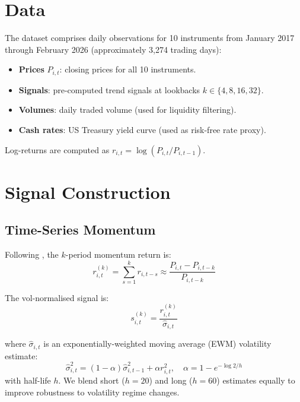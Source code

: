 \documentclass[11pt,a4paper]{article}
\begin{document}
\section{Data}

The dataset comprises daily observations for 10 instruments from January 2017 through
February 2026 (approximately 3,274 trading days):
\begin{itemize}
  \item \textbf{Prices} $P_{i,t}$: closing prices for all 10 instruments.
  \item \textbf{Signals}: pre-computed trend signals at lookbacks $k \in \{4, 8, 16, 32\}$.
  \item \textbf{Volumes}: daily traded volume (used for liquidity filtering).
  \item \textbf{Cash rates}: US Treasury yield curve (used as risk-free rate proxy).
\end{itemize}

Log-returns are computed as $r_{i,t} = \log(P_{i,t} / P_{i,t-1})$.

\section{Signal Construction}

\subsection{Time-Series Momentum}

Following \citet{moskowitz2012}, the $k$-period momentum return is:
\begin{equation}
  r^{(k)}_{i,t} = \sum_{s=1}^{k} r_{i,t-s} \approx \frac{P_{i,t} - P_{i,t-k}}{P_{i,t-k}}
\end{equation}

The vol-normalised signal is:
\begin{equation}
  s^{(k)}_{i,t} = \frac{r^{(k)}_{i,t}}{\hat{\sigma}_{i,t}}
\end{equation}

where $\hat{\sigma}_{i,t}$ is an exponentially-weighted moving average (EWM) volatility
estimate:
\begin{equation}
  \hat{\sigma}^2_{i,t} = (1 - \alpha)\hat{\sigma}^2_{i,t-1} + \alpha r^2_{i,t}, \quad
  \alpha = 1 - e^{-\log 2 / h}
\end{equation}
with half-life $h$. We blend short ($h=20$) and long ($h=60$) estimates equally to
improve robustness to volatility regime changes.
\end{document}
